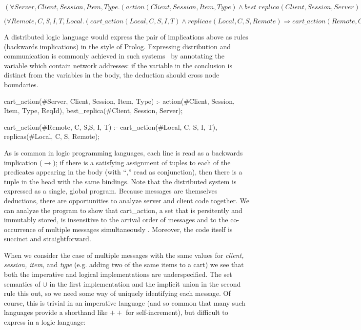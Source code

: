 $(\forall Server, Client, Session, Item, Type . ( action(Client, Session, Item, Type) 
\land best\_replica(Client, Session, Server) ) \Rightarrow cart\_action(Server, Client, Session, Item, Type)) $


$(\forall Remote, C, S, I, T, Local . (cart\_action(Local, C, S, I, T) \land
replicas(Local, C, S, Remote) \Rightarrow cart\_action(Remote, C, S, I, T))
$

A distributed logic language would express the pair of implications above as rules
(backwards implications) in the style of Prolog.  Expressing distribution and communication
is commonly achieved in such systems~\cite{Loo} by annotating the variable which 
contain network addresses: if the variable in the conclusion is distinct from the variables in
the body, the deduction should cross node boundaries.

\begin{Dedalus}
cart\_action(#Server, Client, Session, Item, Type) :-
  action(#Client, Session, Item, Type, ReqId),
  best_replica(#Client, Session, Server);

cart\_action(#Remote, C, S,S, I, T) :-
  cart\_action(#Local, C, S, I, T),
  replicas(#Local, C, S, Remote);
\end{Dedalus}

As is common in logic programming languages, each line is read as a backwards
implication ($\rightarrow$); if there is a satisfying assignment of tuples to each of
the predicates appearing in the body (with ``,'' read as conjunction), 
then there is a tuple in the head with the same bindings.
Note that the distributed system is expressed as a single, global program.
Because messages are themselves deductions, there are opportunities to 
analyze server and client code together.  We can analyze the program to 
show that cart\_action, a set that is persitently and immutably
stored, is insensitive to the arrival order of messages 
and to the co-occurrence of multiple messages simultaneously
. Moreover, the code 
itself is succinct and straightforward. 




When we consider the case of multiple messages with the same values for
{\em client, session, item}, and {\em type} (e.g. adding two of the same items to a cart)
we see that both the imperative and logical implementations are underspecified.
The set semantics of $\cup$ in the first implementation and the implicit union 
in the second rule this out, so we need some way of uniquely identifying each message.
Of course, this is trivial in an imperative language (and so common that many such languages
provide a shorthand like $++$ for self-increment), but difficult to express in a logic language:

